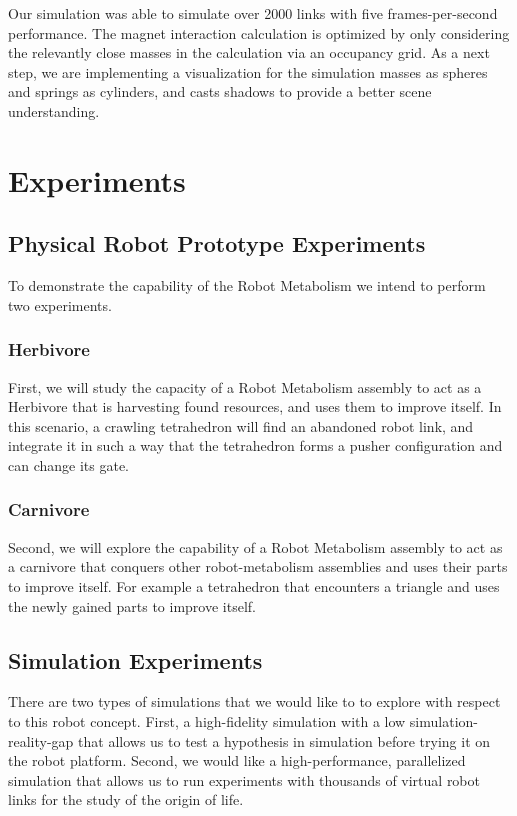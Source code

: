 \documentclass[letterpaper, 10 pt, conference]{ieeeconf}  %
\begin{document}
Our simulation was able to simulate over 2000 links with five frames-per-second performance. The magnet interaction calculation is optimized by only considering the relevantly close masses in the calculation via an occupancy grid. As a next step, we are implementing a visualization for the simulation masses as spheres and springs as cylinders, and casts shadows to provide a better scene understanding.

\section{Experiments}

\subsection{Physical Robot Prototype Experiments} To demonstrate the capability of the Robot Metabolism we intend to perform two experiments.
\subsubsection{Herbivore} First, we will study the capacity of a Robot Metabolism assembly to act as a Herbivore that is harvesting found resources, and uses them to improve itself. In this scenario, a crawling tetrahedron will find an abandoned robot link, and integrate it in such a way that the tetrahedron forms a pusher configuration and can change its gate.
\subsubsection{Carnivore} Second, we will explore the capability of a Robot Metabolism assembly to act as a carnivore that conquers other robot-metabolism assemblies and uses their parts to improve itself. For example a tetrahedron that encounters a triangle and uses the newly gained parts to improve itself.

\subsection{Simulation Experiments}
There are two types of simulations that we would like to to explore with respect to this robot concept. First, a high-fidelity simulation with a low simulation-reality-gap that allows us to test a hypothesis in simulation before trying it on the robot platform. Second, we would like a high-performance, parallelized simulation that allows us to run experiments with thousands of virtual robot links for the study of the origin of life.
\end{document}
